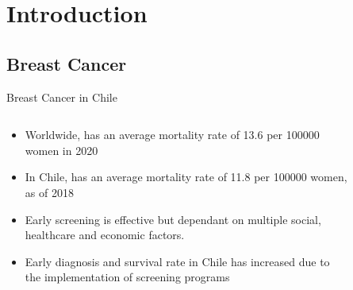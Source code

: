 \section{Introduction}
\subsection{Breast Cancer}
\begin{frame}{Breast Cancer in Chile}
    \begin{columns}
        \begin{column}{0.6\textwidth}
            \begin{itemize}
                \item Worldwide, has an average mortality rate of \num{13.6} per \num{100000} women in 2020 
                \item In Chile, has an average mortality rate of \num{11.8} per \num{100000} women, as of 2018 
                \item Early screening is effective but dependant on multiple social, healthcare and economic factors.
                \item Early diagnosis and survival rate in Chile has increased due to the implementation of screening programs 
            \end{itemize}
        \end{column}
        \begin{column}{0.4\textwidth}
            \begin{figure}
                \centering

\end{figure}
\end{column}
\end{columns}
\end{frame}

